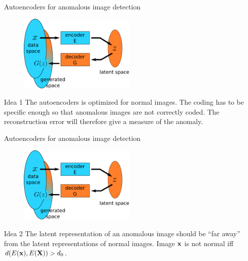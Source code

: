 \documentclass[xcolor=pdftex,dvipsnames,table,mathserif]{beamer}
\begin{document}
\begin{frame}{Autoencoders for anomalous image detection}

  \begin{figure}[ht]
    \centering
    \includegraphics[width=0.5\textwidth]{ae.png}
  \end{figure}

  \begin{block}{Idea 1}
    The autoencoders is optimized for normal images. The coding has to be specific enough so that anomalous images are not correctly coded. The reconstruction error will therefore give a measure of the anomaly.
  \end{block}

\end{frame}

\begin{frame}{Autoencoders for anomalous image detection}

  \begin{figure}[ht]
    \centering
    \includegraphics[width=0.5\textwidth]{ae.png}
  \end{figure}

  \begin{block}{Idea 2}
    The latent representation of an anomalous image should be ``far away'' from the latent representations of normal images. Image $\mathbf{x}$ is not normal iff $d(E(\mathbf{x}), E(\mathbf{X})) > d_0$.
  \end{block}

\end{frame}
\end{document}

